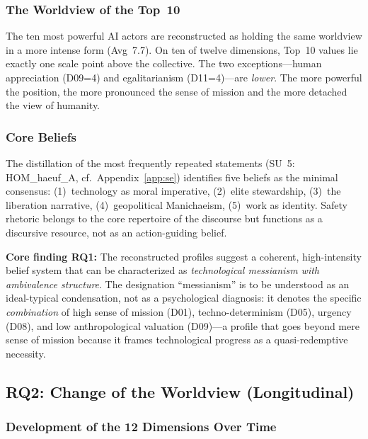 \documentclass[12pt,a4paper]{article}
\begin{document}
\subsubsection{\texorpdfstring{The Worldview of the Top~10}{The Worldview of the Top 10}}

The ten most powerful AI actors are reconstructed as holding the same worldview in a more intense form (Avg~7.7). On ten of twelve dimensions, Top~10 values lie exactly one scale point above the collective. The two exceptions---human appreciation (D09=4) and egalitarianism (D11=4)---are \emph{lower}. The more powerful the position, the more pronounced the sense of mission and the more detached the view of humanity.


\subsubsection{Core Beliefs}

The distillation of the most frequently repeated statements (SU~5: HOM\_haeuf\_A, cf.\ Appendix~\ref{app:se}) identifies five beliefs as the minimal consensus: (1)~technology as moral imperative, (2)~elite stewardship, (3)~the liberation narrative, (4)~geopolitical Manichaeism, (5)~work as identity. Safety rhetoric belongs to the core repertoire of the discourse but functions as a discursive resource, not as an action-guiding belief.

\medskip
\noindent\textbf{Core finding RQ1:} The reconstructed profiles suggest a coherent, high-intensity belief system that can be characterized as \emph{technological messianism with ambivalence structure}. The designation ``messianism'' is to be understood as an ideal-typical condensation, not as a psychological diagnosis: it denotes the specific \emph{combination} of high sense of mission (D01), techno-determinism (D05), urgency (D08), and low anthropological valuation (D09)---a profile that goes beyond mere sense of mission because it frames technological progress as a quasi-redemptive necessity.


\subsection{RQ2: Change of the Worldview (Longitudinal)}
\label{sec:ergebnisse:f2}

\subsubsection{Development of the 12 Dimensions Over Time}
\end{document}
